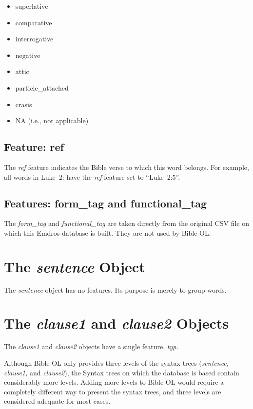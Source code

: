 \documentclass[11pt,oneside,a4paper]{memoir}
\newcommand*{\bibleref}[3]{#1~#2\thinspace:\thinspace#3}
\begin{document}
\begin{itemize}
\item superlative
\item comparative
\item interrogative
\item negative
\item attic
\item particle\_attached
\item crasis
\item NA (i.e., not applicable)
\end{itemize}

\subsection{Feature: ref}

The \emph{ref} feature indicates the Bible verse to which this word belongs. For example, all words
in \bibleref{Luke}{2}{5} have the \emph{ref} feature set to ``Luke~2:5''.

\subsection{Features: form\_tag and functional\_tag}

The \emph{form\_tag} and \emph{functional\_tag} are taken directly from the original CSV file on
which this Emdros database is built. They are not used by Bible OL.

\section{The \emph{sentence} Object}

The \emph{sentence} object has no features. Its purpose is merely to group words.

\section{The \emph{clause1} and \emph{clause2} Objects}

The \emph{clause1} and \emph{clause2} objects have a single feature, \emph{typ.}

Although Bible OL only provides three levels of the syntax trees (\emph{sentence, clause1,} and
\emph{clause2}), the Syntax trees on which the database is based contain considerably more levels.
Adding more levels to Bible OL would require a completely different way to present the syntax trees,
and three levels are considered adequate for most cases.
\end{document}
